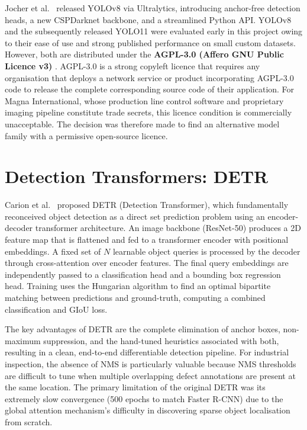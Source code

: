 Jocher et al.\ \cite{jocher2022} released YOLOv8 via Ultralytics, introducing anchor-free detection heads, a new CSPDarknet backbone, and a streamlined Python API. YOLOv8 and the subsequently released YOLO11 were evaluated early in this project owing to their ease of use and strong published performance on small custom datasets. However, both are distributed under the \textbf{AGPL-3.0 (Affero GNU Public Licence v3)} \cite{jocher2022}. AGPL-3.0 is a strong copyleft licence that requires any organisation that deploys a network service or product incorporating AGPL-3.0 code to release the complete corresponding source code of their application. For Magna International, whose production line control software and proprietary imaging pipeline constitute trade secrets, this licence condition is commercially unacceptable. The decision was therefore made to find an alternative model family with a permissive open-source licence.

\section{Detection Transformers: DETR}

Carion et al.\ \cite{carion2020} proposed DETR (Detection Transformer), which fundamentally reconceived object detection as a direct set prediction problem using an encoder-decoder transformer architecture. An image backbone (ResNet-50) produces a 2D feature map that is flattened and fed to a transformer encoder with positional embeddings. A fixed set of $N$ learnable object queries is processed by the decoder through cross-attention over encoder features. The final query embeddings are independently passed to a classification head and a bounding box regression head. Training uses the Hungarian algorithm to find an optimal bipartite matching between predictions and ground-truth, computing a combined classification and GIoU loss.

The key advantages of DETR are the complete elimination of anchor boxes, non-maximum suppression, and the hand-tuned heuristics associated with both, resulting in a clean, end-to-end differentiable detection pipeline. For industrial inspection, the absence of NMS is particularly valuable because NMS thresholds are difficult to tune when multiple overlapping defect annotations are present at the same location. The primary limitation of the original DETR was its extremely slow convergence (500 epochs to match Faster R-CNN) due to the global attention mechanism's difficulty in discovering sparse object localisation from scratch.

